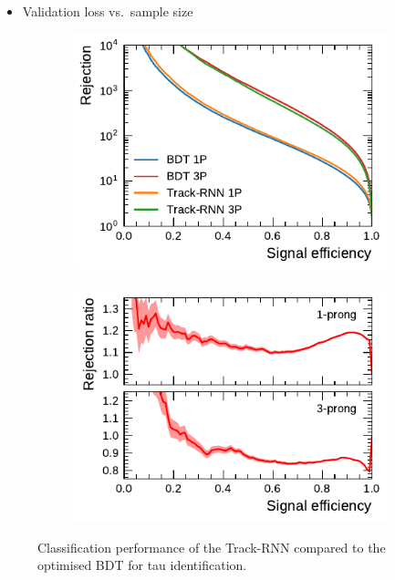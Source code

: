 \begin{itemize}
\item Validation loss vs.\ sample size
\end{itemize}

\begin{figure}[ht]
  \begin{subfigure}[t]{0.48\textwidth}
    \centering
    \includegraphics{./figures/rnn/track/roc.pdf}
  \end{subfigure}\hfill
  \begin{subfigure}[t]{0.48\textwidth}
    \centering
    \includegraphics{./figures/rnn/track/ratios.pdf}
  \end{subfigure}
  \caption{Classification performance of the Track-RNN compared to the optimised
    BDT for tau identification.}
  \label{fig:track_rnn_roc_ratios}
\end{figure}

